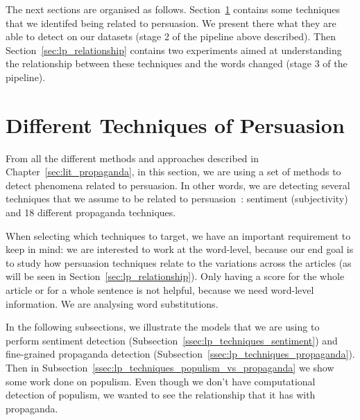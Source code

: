 
The next sections are organised as follows. Section~\ref{sec:lp_techniques} contains some techniques that we identifed being related to persuasion. We present there what they are able to detect on our datasets (stage 2 of the pipeline above described). Then Section~\ref{sec:lp_relationship} contains two experiments aimed at understanding the relationship between these techniques and the words changed (stage 3 of the pipeline).

\section{Different Techniques of Persuasion}
\label{sec:lp_techniques}


From all the different methods and approaches described in Chapter~\ref{sec:lit_propaganda}, in this section, we are using a set of methods to detect phenomena related to persuasion. %
In other words, we are detecting several techniques that we assume to be related to persuasion~\cite{gass2018persuasion}: sentiment (subjectivity) and 18 different propaganda techniques.%

When selecting which techniques to target, we have an important requirement to keep in mind: we are interested to work at the word-level, because our end goal is to study how persuasion techniques relate to the variations across the articles (as will be seen in Section~\ref{sec:lp_relationship}). Only having a score for the whole article or for a whole sentence is not helpful, because we need word-level information. We are analysing word substitutions.

In the following subsections, we illustrate the models that we are using to perform sentiment detection (Subsection~\ref{ssec:lp_techniques_sentiment}) and fine-grained propaganda detection (Subsection~\ref{ssec:lp_techniques_propaganda}).
Then in Subsection~\ref{ssec:lp_techniques_populism_vs_propaganda} we show some work done on populism. Even though we don't have computational detection of populism, we wanted to see the relationship that it has with propaganda.

